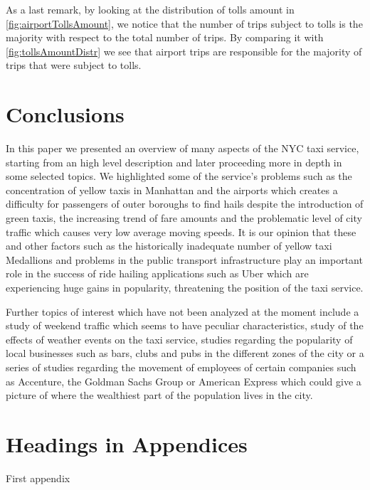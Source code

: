 \documentclass{acm_proc_article-sp-sigmod09}
\begin{document}
As a last remark, by looking at the distribution of tolls amount in \cref{fig:airportTollsAmount}, we notice that the number of trips subject to tolls is the majority with respect to the total number of trips. By comparing it with \cref{fig:tollsAmountDistr} we see that airport trips are responsible for the majority of trips that were subject to tolls.

\section{Conclusions}

In this paper we presented an overview of many aspects of the NYC taxi service, starting from an high level description and later proceeding more in depth in some selected topics. We highlighted some of the service's problems such as the concentration of yellow taxis in Manhattan and the airports which creates a difficulty for passengers of outer boroughs to find hails despite the introduction of green taxis, the increasing trend of fare amounts and the problematic level of city traffic which causes very low average moving speeds. It is our opinion that these and other factors such as the historically inadequate number of yellow taxi Medallions and problems in the public transport infrastructure play an important role in the success of ride hailing applications such as Uber which are experiencing huge gains in popularity, threatening the position of the taxi service.

Further topics of interest which have not been analyzed at the moment include a study of weekend traffic which seems to have peculiar characteristics, study of the effects of weather events on the taxi service, studies regarding the popularity of local businesses such as bars, clubs and pubs in the different zones of the city or a series of studies regarding the movement of employees of certain companies such as Accenture, the Goldman Sachs Group or American Express which could give a picture of where the wealthiest part of the population lives in the city.

%




\balancecolumns
\appendix
\section{Headings in Appendices}
First appendix
\end{document}
